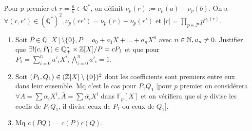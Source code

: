 
\begin{statementbox}
Pour $p$ premier et $r = \frac{a}{b} \in \mathbb{Q}^*$, on définit $\nu_p(r) := \nu_p(a) - \nu_p(b)$.
On a $\forall (r,r') \in (\mathbb{Q}^*)^2, \nu_p(rr') = \nu_p(r) + \nu_p(r')$ et $|r| = \prod_{p \in \mathcal{P}} p^{\nu_p(r)}$.
\begin{enumerate}
  \item Soit $P \in \mathbb{Q}[X] \setminus \{0\}, P = a_0 + a_1 X + \dots + a_n X^n$ avec $n \in \mathbb N, a_n \neq 0$. Justifier que $\exists! (c, P_1) \in \mathbb{Q}_+^* \times \mathbb Z[X] / P = c P_1$ et que pour $P_1 = \sum_{i=0}^n a'_i X^i, \bigwedge_{i=0}^n a'_i = 1$.
  \item Soit $(P_1, Q_1) \in (\mathbb Z[X] \setminus \{0\})^2$ dont les coefficients sont premiers entre eux dans leur ensemble. Mq c'est le cas pour $P_1 Q_1$ [pour $p$ premier on considérera $\forall A = \sum \alpha_i X^i, \overline{A} = \sum \overline{\alpha_i} X^i$ dans $\mathbb{F}_p[X]$ et on vérifiera que si $p$ divise les coeffs de $P_1 Q_1$, il divise ceux de $P_1$ ou ceux de $Q_1$].
  \item Mq $c(PQ) = c(P)c(Q)$.
\end{enumerate}
\end{statementbox}

